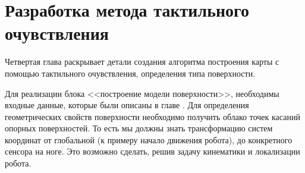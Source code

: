 \chapter{Разработка метода тактильного очувствления}\label{ch:ch4}

Четвертая глава раскрывает детали создания алгоритма построения карты с помощью тактильного очувствления, определения типа поверхности.

Для реализации блока <<построение модели поверхности>>, необходимы входные данные, которые были  описаны в главе . Для определения геометрических свойств поверхности необходимо получить облако точек касаний опорных поверхностей. То есть мы должны знать трансформацию систем координат от глобальной (к примеру начало движения робота), до конкретного сенсора на ноге. Это возможно сделать, решив задачу кинематики и локализации робота.

